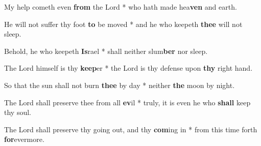 \begin{multicols}{2}
	My help cometh even \textbf{from} the Lord * who hath made hea\textbf{ven} and earth.
	
	He will not suffer thy foot \textbf{to} be moved * and he who keepeth \textbf{thee} will not sleep.
	
	Behold, he who keepeth \textbf{Is}rael * shall neither slum\textbf{ber} nor sleep.
	
	The Lord himself is thy \textbf{keep}er * the Lord is thy defense upon \textbf{thy} right hand.
	
	So that the sun shall not burn \textbf{thee} by day * neither \textbf{the} moon by night.
	
	The Lord shall preserve thee from all \textbf{ev}il * truly, it is even he who \textbf{shall} keep thy soul.
	
	The Lord shall preserve thy going out, and thy \textbf{com}ing in * from this time forth \textbf{for}evermore.
\end{multicols}